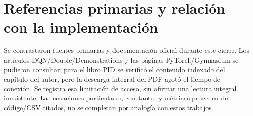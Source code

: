 \documentclass[12pt,a4paper]{article}
\begin{document}
\section{Referencias primarias y relación con la implementación}
Se contrastaron fuentes primarias y documentación oficial durante este cierre. Los artículos DQN/\allowbreak{}Double/\allowbreak{}Demonstrations y las páginas PyTorch/\allowbreak{}Gymnasium se pudieron consultar; para el libro PID se verificó el contenido indexado del capítulo del autor,\allowbreak{} pero la descarga integral del PDF agotó el tiempo de conexión. Se registra esa limitación de acceso,\allowbreak{} sin afirmar una lectura integral inexistente. Las ecuaciones particulares,\allowbreak{} constantes y métricas proceden del código/\allowbreak{}CSV citados,\allowbreak{} no se completan por analogía con estos trabajos.
\end{document}
